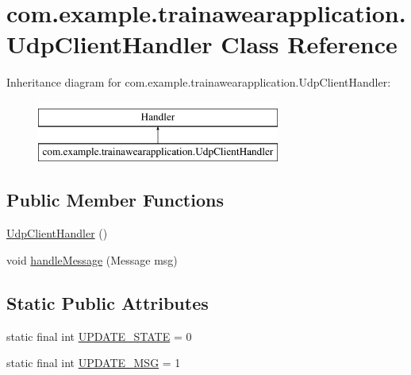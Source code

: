 \hypertarget{classcom_1_1example_1_1trainawearapplication_1_1_udp_client_handler}{}\section{com.\+example.\+trainawearapplication.\+Udp\+Client\+Handler Class Reference}
\label{classcom_1_1example_1_1trainawearapplication_1_1_udp_client_handler}
Inheritance diagram for com.\+example.\+trainawearapplication.\+Udp\+Client\+Handler\+:\begin{figure}[H]
\begin{center}
\leavevmode
\includegraphics[height=2.000000cm]{classcom_1_1example_1_1trainawearapplication_1_1_udp_client_handler}
\end{center}
\end{figure}
\subsection*{Public Member Functions}
\begin{DoxyCompactItemize}
\item 
\mbox{\hyperlink{classcom_1_1example_1_1trainawearapplication_1_1_udp_client_handler_ab5ff425dbf594d074ab709f2be441419}{Udp\+Client\+Handler}} ()
\item 
void \mbox{\hyperlink{classcom_1_1example_1_1trainawearapplication_1_1_udp_client_handler_a433f624fad2243aaed2e97f7f3cb8434}{handle\+Message}} (Message msg)
\end{DoxyCompactItemize}
\subsection*{Static Public Attributes}
\begin{DoxyCompactItemize}
\item 
static final int \mbox{\hyperlink{classcom_1_1example_1_1trainawearapplication_1_1_udp_client_handler_abb97ab46d1d8c23159f9ea1319425a5c}{U\+P\+D\+A\+T\+E\+\_\+\+S\+T\+A\+TE}} = 0
\item 
static final int \mbox{\hyperlink{classcom_1_1example_1_1trainawearapplication_1_1_udp_client_handler_ae0a5ca10db5db46916ca3a3acb7416b8}{U\+P\+D\+A\+T\+E\+\_\+\+M\+SG}} = 1
\end{DoxyCompactItemize}
